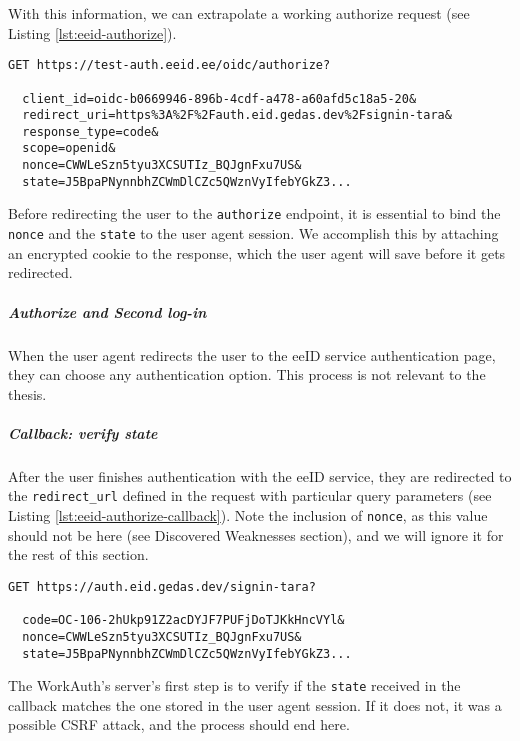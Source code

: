 With this information, we can extrapolate a working {authorize} request (see Listing \ref{lst:eeid-authorize}).

\begin{lstlisting}[caption={The eeID service authorize endpoint request}, label={lst:eeid-authorize}] 
  GET https://test-auth.eeid.ee/oidc/authorize?

  client_id=oidc-b0669946-896b-4cdf-a478-a60afd5c18a5-20&
  redirect_uri=https%3A%2F%2Fauth.eid.gedas.dev%2Fsignin-tara&
  response_type=code&
  scope=openid&
  nonce=CWWLeSzn5tyu3XCSUTIz_BQJgnFxu7US&
  state=J5BpaPNynnbhZCWmDlCZc5QWznVyIfebYGkZ3...
\end{lstlisting}

Before redirecting the user to the \texttt{authorize} endpoint, it is essential to bind the \texttt{nonce} and the \texttt{state} to the user agent session. We accomplish this by attaching an encrypted cookie to the response, which the user agent will save before it gets redirected.

\subparagraph{Authorize and Second log-in}

When the user agent redirects the user to the eeID service authentication page, they can choose any authentication option. This process is not relevant to the thesis.

\subparagraph{Callback: verify state}

After the user finishes authentication with the eeID service, they are redirected to the \texttt{redirect\_url} defined in the request with particular query parameters (see Listing \ref{lst:eeid-authorize-callback}). Note the inclusion of \texttt{nonce}, as this value should not be here \cite{okta-oidc-spec} (see Discovered Weaknesses section), and we will ignore it for the rest of this section.

\begin{lstlisting}[caption={The eeID service authorize redirect response}, label={lst:eeid-authorize-callback}]
  GET https://auth.eid.gedas.dev/signin-tara?
  
  code=OC-106-2hUkp91Z2acDYJF7PUFjDoTJKkHncVYl&
  nonce=CWWLeSzn5tyu3XCSUTIz_BQJgnFxu7US&
  state=J5BpaPNynnbhZCWmDlCZc5QWznVyIfebYGkZ3...
\end{lstlisting}

The WorkAuth's server's first step is to verify if the \texttt{state} received in the callback matches the one stored in the user agent session. If it does not, it was a possible CSRF attack, and the process should end here.

